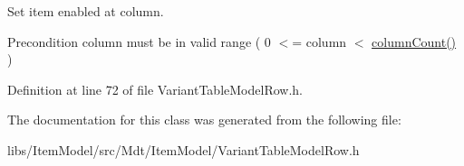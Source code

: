 Set item enabled at column. 

\begin{DoxyPrecond}{Precondition}
column must be in valid range ( 0 $<$= column $<$ \hyperlink{class_mdt_1_1_item_model_1_1_variant_table_model_row_a244df69ed410f0dc7f1fdd48d1b55931}{column\+Count()} ) 
\end{DoxyPrecond}


Definition at line 72 of file Variant\+Table\+Model\+Row.\+h.



The documentation for this class was generated from the following file\+:\begin{DoxyCompactItemize}
\item 
libs/\+Item\+Model/src/\+Mdt/\+Item\+Model/Variant\+Table\+Model\+Row.\+h\end{DoxyCompactItemize}
